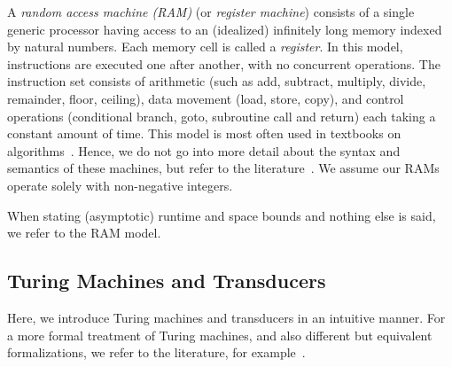A \emph{random access machine (RAM)} (or \emph{register machine}) consists
of a single generic processor having access to an (idealized) infinitely long memory indexed by natural numbers. 
Each memory cell is called a \emph{register}.
In this model, instructions are executed one after another, with no concurrent operations.
The instruction set consists of arithmetic (such as add, subtract, multiply, divide, remainder, floor, ceiling), data movement (load, store, copy),
and control operations (conditional branch, goto, subroutine call and return) each taking a constant amount of time.
This model is most often used in textbooks on algorithms~\cite{cormen01introduction}.
Hence, we do not go into more detail about 
the syntax and semantics of these machines, but refer to the literature~\cite{cormen01introduction,DBLP:journals/jacm/ShepherdsonS63}.
We assume our RAMs operate solely with non-negative integers. 

When stating (asymptotic) runtime and space bounds and nothing else is said, we refer to the RAM model.

\subsection{Turing Machines and Transducers}
\label{prelim:sec:TM} 

Here, we introduce Turing machines and transducers in an intuitive manner.
For a more formal treatment of Turing machines, and also different but equivalent formalizations, 
we refer to the literature, for example~\cite{HopUll79}.

